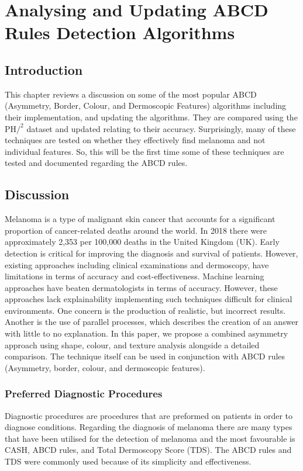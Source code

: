 \chapter{Analysing and Updating ABCD Rules Detection Algorithms}

\section{Introduction}
This chapter reviews a discussion on some of the most popular ABCD (Asymmetry, Border, Colour, and Dermoscopic Features) algorithms including their implementation, and updating the algorithms. They are compared using the PH$/^2$ dataset and updated relating to their accuracy. Surprisingly, many of these techniques are tested on whether they effectively find melanoma and not individual features. So, this will be the first time some of these techniques are tested and documented regarding the ABCD rules.

\section{Discussion}
Melanoma is a type of malignant skin cancer that accounts for a significant proportion of cancer-related deaths around the world. In 2018 there were approximately 2,353 per 100,000 deaths in the United Kingdom (UK)\cite{UK2019}. Early detection is critical for improving the diagnosis and survival of patients. However, existing approaches including clinical examinations and dermoscopy, have limitations in terms of accuracy and cost-effectiveness\cite{Takiddin2021}. Machine learning approaches have beaten dermatologists in terms of accuracy\cite{Andre2017}. However, these approaches lack explainability implementing such techniques difficult for clinical environments\cite{Fan2017}. One concern is the production of realistic, but incorrect results\cite{Ghorbani2019}. Another is the use of parallel processes, which describes the creation of an answer with little to no explanation. In this paper, we propose a combined asymmetry approach using shape, colour, and texture analysis alongside a detailed comparison. The technique itself can be used in conjunction with ABCD rules (Asymmetry, border, colour, and dermoscopic features).

\subsection{Preferred Diagnostic Procedures}
Diagnostic procedures are procedures that are preformed on patients in order to diagnose conditions. Regarding the diagnosis of melanoma there are many types that have been utilised for the detection of melanoma and the most favourable is CASH, ABCD rules, and Total Dermoscopy Score (TDS). The ABCD rules and TDS were commonly used because of its simplicity and effectiveness.

